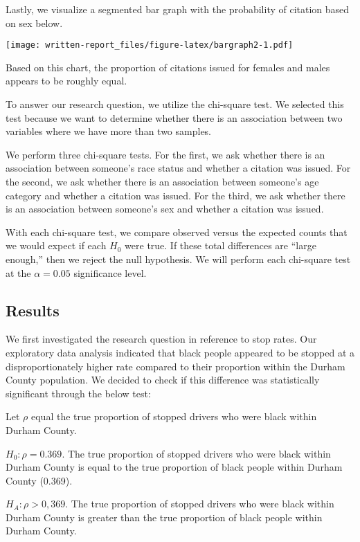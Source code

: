 \documentclass[
]{article}
\begin{document}
Lastly, we visualize a segmented bar graph with the probability of
citation based on sex below.

\texttt{[image: written-report\_files/figure-latex/bargraph2-1.pdf]}

Based on this chart, the proportion of citations issued for females and
males appears to be roughly equal.

To answer our research question, we utilize the chi-square test. We
selected this test because we want to determine whether there is an
association between two variables where we have more than two samples.

We perform three chi-square tests. For the first, we ask whether there
is an association between someone's race status and whether a citation
was issued. For the second, we ask whether there is an association
between someone's age category and whether a citation was issued. For
the third, we ask whether there is an association between someone's sex
and whether a citation was issued.

With each chi-square test, we compare observed versus the expected
counts that we would expect if each \(H_0\) were true. If these total
differences are ``large enough,'' then we reject the null hypothesis. We
will perform each chi-square test at the \(\alpha = 0.05\) significance
level.

\hypertarget{results}{%
\subsection{Results}\label{results}}

We first investigated the research question in reference to stop rates.
Our exploratory data analysis indicated that black people appeared to be
stopped at a disproportionately higher rate compared to their proportion
within the Durham County population. We decided to check if this
difference was statistically significant through the below test:

Let \(\rho\) equal the true proportion of stopped drivers who were black
within Durham County.

\(H_0: \rho = 0.369\). The true proportion of stopped drivers who were
black within Durham County is equal to the true proportion of black
people within Durham County (0.369).

\(H_A: \rho > 0,369\). The true proportion of stopped drivers who were
black within Durham County is greater than the true proportion of black
people within Durham County.
\end{document}
